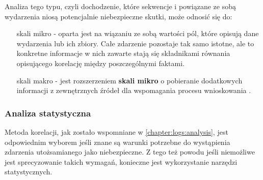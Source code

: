        Analiza tego typu, czyli dochodzenie, które sekwencje i powiązane ze sobą wydarzenia niosą
        potencjalnie niebezpieczne skutki, może odnosić się do:
        \begin{itemize}
            \item[skali mikro] - oparta jest na wiązaniu ze sobą wartości pól, które opisują dane wydarzenia lub
            ich zbiory. Całe zdarzenie pozostaje tak samo istotne, ale to konkretne informacje w nich zawarte
            stają się składnikami równania opisującego korelację między poszczególnymi faktami. 
            \item[skali makro] - jest rozszerzeniem \textbf{skali mikro} o pobieranie dodatkowych informacji z zewnętrznych 
            źródeł dla wspomagania procesu wnioskowania \cite{logging_log_management}. 
        \end{itemize}
        
        \subsubsection{Analiza statystyczna}
        Metoda korelacji, jak zostało wspomniane w \ref{chapter:logs:analysis}, jest odpowiednim wyborem jeśli
        znane są warunki potrzebne do wystąpienia zdarzenia utożsamianego jako niebezpieczne. Z tego też powodu
        jeśli niemożliwe jest sprecyzowanie takich wymagań, konieczne jest wykorzystanie narzędzi statystycznych.
        

